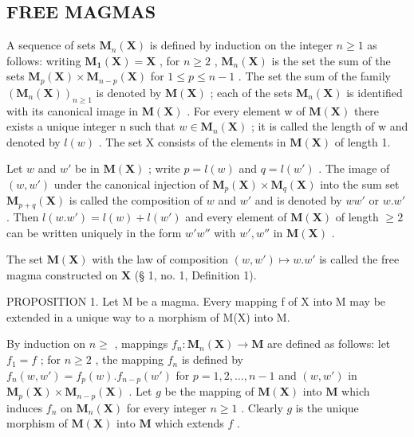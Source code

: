 \subsection{FREE MAGMAS}

A sequence of sets \(\mathbf{M}_{n}(\mathbf{X})\) is defined by induction on the integer \(n \geqslant 1\) as follows: writing \(\mathbf{M}_{\mathbf{1}}(\mathbf{X}) = \mathbf{X}\) , for \(n \geqslant 2\) , \(\mathbf{M}_{n}(\mathbf{X})\) is the set the sum of the sets \(\mathbf{M}_{p}(\mathbf{X}) \times \mathbf{M}_{n-p}(\mathbf{X})\) for \(1 \leqslant p \leqslant n - 1\) . The set the sum of the family \((\mathbf{M}_{n}(\mathbf{X}))_{n \geqslant 1}\) is denoted by \(\mathbf{M}(\mathbf{X})\) ; each of the sets \(\mathbf{M}_{n}(\mathbf{X})\) is identified with its canonical image in \(\mathbf{M}(\mathbf{X})\) . For every element w of \(\mathbf{M}(\mathbf{X})\) there exists a unique integer n such that \(w \in \mathbf{M}_{n}(\mathbf{X})\) ; it is called the length of w and denoted by \(l(w)\) . The set X consists of the elements in \(\mathbf{M}(\mathbf{X})\) of length 1.

Let \(w\) and \(w'\) be in \(\mathbf{M}(\mathbf{X})\) ; write \(p = l(w)\) and \(q = l(w')\) . The image of \((w, w')\) under the canonical injection of \(\mathbf{M}_p(\mathbf{X}) \times \mathbf{M}_q(\mathbf{X})\) into the sum set \(\mathbf{M}_{p + q}(\mathbf{X})\) is called the composition of \(w\) and \(w'\) and is denoted by \(ww'\) or \(w.w'\) . Then \(l(w.w') = l(w) + l(w')\) and every element of \(\mathbf{M}(\mathbf{X})\) of length \(\geqslant 2\) can be written uniquely in the form \(w'w''\) with \(w', w''\) in \(\mathbf{M}(\mathbf{X})\) .

The set \(\mathbf{M}(\mathbf{X})\) with the law of composition \((w, w') \mapsto w.w'\) is called the free magma constructed on \(\mathbf{X}\) (§ 1, no. 1, Definition 1).

PROPOSITION 1. Let M be a magma. Every mapping f of X into M may be extended in a unique way to a morphism of M(X) into M.

By induction on \(n \geqslant\) , mappings \(f_n: \mathbf{M}_n(\mathbf{X}) \to \mathbf{M}\) are defined as follows: let \(f_{1} = f\) ; for \(n \geqslant 2\) , the mapping \(f_{n}\) is defined by \(f_{n}(w, w') = f_{p}(w).f_{n-p}(w')\) for \(p = 1, 2, \ldots, n - 1\) and \((w, w')\) in \(\mathbf{M}_{p}(\mathbf{X}) \times \mathbf{M}_{n-p}(\mathbf{X})\) . Let \(g\) be the mapping of \(\mathbf{M}(\mathbf{X})\) into \(\mathbf{M}\) which induces \(f_{n}\) on \(\mathbf{M}_{n}(\mathbf{X})\) for every integer \(n \geqslant 1\) . Clearly \(g\) is the unique morphism of \(\mathbf{M}(\mathbf{X})\) into \(\mathbf{M}\) which extends \(f\) .

